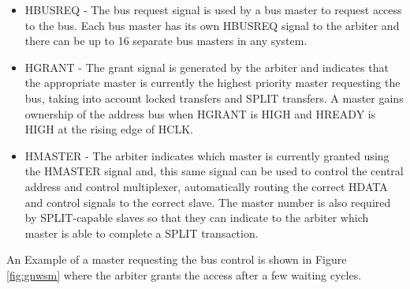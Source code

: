  \begin{itemize}

\item  {HBUSREQ - } The bus request signal is used by a bus master to request access to the bus. Each bus master has its own HBUSREQ signal to the arbiter and there can be up to 16 separate bus masters in any system.


\item  {HGRANT - } The grant signal is generated by the arbiter and indicates that the appropriate master is currently the highest priority master requesting the bus, taking into account locked transfers and SPLIT transfers. A master gains ownership of the address bus when HGRANT is HIGH and HREADY is HIGH at the rising edge of HCLK.

\item  {HMASTER - } The arbiter indicates which master is currently granted using the HMASTER signal and,  this same  signal can be used to control the central address and control multiplexer, automatically routing the correct HDATA and control signals to the correct slave. The master number is also required by SPLIT-capable slaves so that they can indicate to the arbiter which master is able to complete a SPLIT transaction.


\end{itemize}

An Example of a master requesting the bus control is shown in Figure \ref{fig:gnwsm} where the arbiter grants the access after a few waiting cycles.



